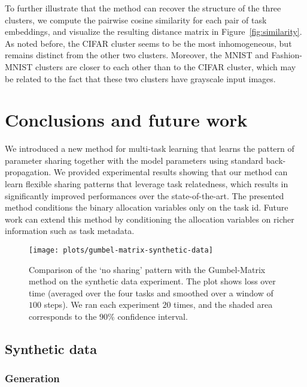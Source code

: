 \documentclass[conference]{IEEEtran}
\begin{document}
To further illustrate that the method can recover the structure of the three clusters, we compute the pairwise cosine similarity for each pair of task embeddings, and visualize the resulting distance matrix in Figure~\ref{fig:similarity}. As noted before, the CIFAR cluster seems to be the most inhomogeneous, but remains distinct from the other two clusters. Moreover, the MNIST and Fashion-MNIST clusters are closer to each other than to the CIFAR cluster, which may be related to the fact that these two clusters have grayscale input images.

\section{Conclusions and future work}\label{sec:conclusions}
We introduced a new method for multi-task learning that learns the pattern of parameter sharing together with the model parameters using standard back-propagation. We provided experimental results showing that our method can learn flexible sharing patterns that leverage task relatedness, which results in significantly improved performances over the state-of-the-art.
The presented method conditions the binary allocation variables only on the task id. Future work can extend this method by conditioning the allocation variables on richer information such as task metadata.




\appendix

\begin{figure*}[t]
\begin{center}
\texttt{[image: plots/gumbel-matrix-synthetic-data]}
\end{center}
\caption{Comparison of the `no sharing' pattern with the Gumbel-Matrix method on the synthetic data experiment. The plot shows loss over time (averaged over the four tasks and smoothed over a window of $100$ steps). We ran each experiment $20$ times, and the shaded area corresponds to the $90\%$ confidence interval.}\label{fig:gumbel_matrix_synthetic_data}
\end{figure*}

\subsection{Synthetic data}

\subsubsection{Generation}\label{appendix:synthetic_data_generation}
\end{document}
